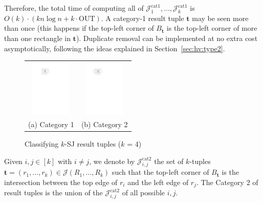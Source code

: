\documentclass[acmsmall,review,anonymous]{acmart}
\def\vgap{\vspace{1mm}}
\def\extraspacing{\vspace{2mm} \noindent}
\def\figcapup{\vspace{-2mm}}
\def\figcapdown{\vspace{-3mm}}
\def\J{\mathcal{J}}
\def\cat{\mathrm{cat1}}
\def\catt{\mathrm{cat2}}
\def\out{\mathrm{OUT}}
\begin{document}
{{{\vgap 

Therefore, the total time of computing all of $\J^\cat_1, ..., \J^\cat_k$ is $O(k) \cdot (kn \log n + k \cdot \out)$. A category-1 result tuple $\bm{t}$ may be seen more than once (this happens if the top-left corner of $B_\bm{t}$ is the top-left corner of more than one rectangle in $\bm{t}$). Duplicate removal can be implemented at no extra cost asymptotically, following the ideas explained in Section~\ref{sec:hv:type2}.


\begin{figure}
    \begin{tabular}{cc}
        \includegraphics[height=27mm]{./artwork/cat1} &
        \hspace{5mm} \includegraphics[height=27mm]{./artwork/cat2} \\
        (a) Category 1 &
        (b) Category 2
    \end{tabular}

    \figcapup
    \caption{Classifying $k$-SJ result tuples ($k$ = 4)}
    \label{fig:ksj:cats}
    \figcapdown
\end{figure}

\extraspacing {\bf Category 2.} Given $i, j \in [k]$ with $i \ne j$, we denote by $\J^\catt_{i,j}$ the set of $k$-tuples $\bm{t} = (r_1, ..., r_k) \in \J(R_1, ..., R_k)$ such that the top-left corner of $B_\bm{t}$ is the intersection between the top edge of $r_i$ and the left edge of $r_j$. The Category 2 of result tuples is the union of the $\J^\catt_{i,j}$ of all possible $i, j$. 

\vgap 

}}}
\end{document}
